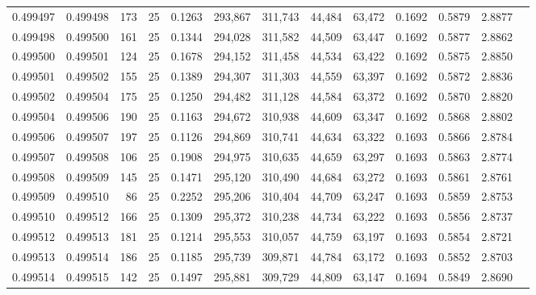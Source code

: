 \begin{tabular}{rrrrrrrrrrrrr}
0.499497 & 0.499498 & 173 &  25 &                                     0.1263 & 293,867 & 311,743 &  44,484 &  63,472 & 0.1692 & 0.5879 & 2.8877 \\
0.499498 & 0.499500 & 161 &  25 &                                     0.1344 & 294,028 & 311,582 &  44,509 &  63,447 & 0.1692 & 0.5877 & 2.8862 \\
0.499500 & 0.499501 & 124 &  25 &                                     0.1678 & 294,152 & 311,458 &  44,534 &  63,422 & 0.1692 & 0.5875 & 2.8850 \\
0.499501 & 0.499502 & 155 &  25 &                                     0.1389 & 294,307 & 311,303 &  44,559 &  63,397 & 0.1692 & 0.5872 & 2.8836 \\
0.499502 & 0.499504 & 175 &  25 &                                     0.1250 & 294,482 & 311,128 &  44,584 &  63,372 & 0.1692 & 0.5870 & 2.8820 \\
0.499504 & 0.499506 & 190 &  25 &                                     0.1163 & 294,672 & 310,938 &  44,609 &  63,347 & 0.1692 & 0.5868 & 2.8802 \\
0.499506 & 0.499507 & 197 &  25 &                                     0.1126 & 294,869 & 310,741 &  44,634 &  63,322 & 0.1693 & 0.5866 & 2.8784 \\
0.499507 & 0.499508 & 106 &  25 &                                     0.1908 & 294,975 & 310,635 &  44,659 &  63,297 & 0.1693 & 0.5863 & 2.8774 \\
0.499508 & 0.499509 & 145 &  25 &                                     0.1471 & 295,120 & 310,490 &  44,684 &  63,272 & 0.1693 & 0.5861 & 2.8761 \\
0.499509 & 0.499510 &  86 &  25 &                                     0.2252 & 295,206 & 310,404 &  44,709 &  63,247 & 0.1693 & 0.5859 & 2.8753 \\
0.499510 & 0.499512 & 166 &  25 &                                     0.1309 & 295,372 & 310,238 &  44,734 &  63,222 & 0.1693 & 0.5856 & 2.8737 \\
0.499512 & 0.499513 & 181 &  25 &                                     0.1214 & 295,553 & 310,057 &  44,759 &  63,197 & 0.1693 & 0.5854 & 2.8721 \\
0.499513 & 0.499514 & 186 &  25 &                                     0.1185 & 295,739 & 309,871 &  44,784 &  63,172 & 0.1693 & 0.5852 & 2.8703 \\
0.499514 & 0.499515 & 142 &  25 &                                     0.1497 & 295,881 & 309,729 &  44,809 &  63,147 & 0.1694 & 0.5849 & 2.8690 \\

\end{tabular}
